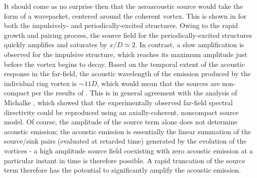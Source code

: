 It should come as no surprise then that the aeroacoustic source would take the form of a wavepacket, centered around the coherent vortex.
This is shown in  for both the impulsively- and periodically-excited structures.
Owing to the rapid growth and pairing process, the source field for the periodically-excited structures quickly amplifies and saturates by $x/D \simeq 2$.
In contrast, a slow amplification is observed for the impulsive structure, which reaches its maximum amplitude just before the vortex begins to decay. 
Based on the temporal extent of the acoustic response in the far-field, the acoustic wavelength of the emission produced by the individual ring vortex is $\sim 11D$, which would mean that the sources are non-compact per the results of .
This is in general agreement with the analysis of Michalke \citep{Michalke1972}, which showed that the experimentally observed far-field spectral directivity could be reproduced using an axially-coherent, noncompact source model.
Of course, the amplitude of the source term alone does not determine acoustic emission; the acoustic emission is essentially the linear summation of the source/sink pairs (evaluated at retarded time) generated by the evolution of the vortices - a high amplitude source field coexisting with zero acoustic emission at a particular instant in time is therefore possible.
A rapid truncation of the source term therefore has the potential to significantly amplify the acoustic emission.
